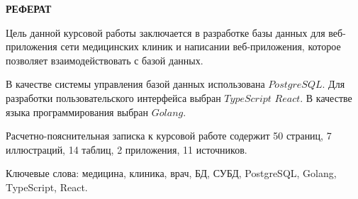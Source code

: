 \setcounter{page}{3}
\begin{center}
	\textbf{\large РЕФЕРАТ}
\end{center}

Цель данной курсовой работы заключается в разработке базы данных для веб-приложения сети медицинских клиник и написании веб-приложения, которое позволяет взаимодействовать с базой данных.

В качестве системы управления базой данных использована $PostgreSQL$. 
Для разработки пользовательского интерфейса выбран $TypeScript$ $React$.
В качестве языка программирования выбран $Golang$.

Расчетно-пояснительная записка к курсовой работе содержит 50 страниц, 7 иллюстраций, 14 таблиц, 2 приложения, 11 источников. 

Ключевые слова: медицина, клиника, врач, БД, СУБД, PostgreSQL, Golang, TypeScript, React.
